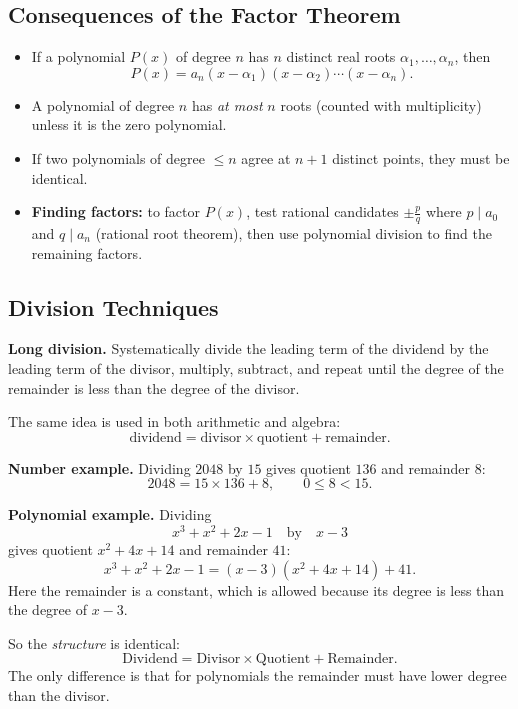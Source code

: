 \documentclass[12pt]{article}
\newenvironment{remark}[1][]{%
  \begin{remarkbox}[title={\bfseries Remark~\thetcbcounter\ifx\relax#1\relax\else\ (#1)\fi}]%
}{%
  \end{remarkbox}%
}
\begin{document}
\subsection{Consequences of the Factor Theorem}

\begin{itemize}[leftmargin=*]
  \item If a polynomial $P(x)$ of degree $n$ has $n$ distinct real roots $\alpha_1, \ldots, \alpha_n$, then
  \[
    P(x) = a_n(x - \alpha_1)(x - \alpha_2)\cdots(x - \alpha_n).
  \]
  \item A polynomial of degree $n$ has \emph{at most} $n$ roots (counted with multiplicity) unless it is the zero polynomial.
  \item If two polynomials of degree $\leq n$ agree at $n+1$ distinct points, they must be identical.
  \item \textbf{Finding factors:} to factor $P(x)$, test rational candidates $\pm\frac{p}{q}$ where $p \mid a_0$ and $q \mid a_n$ (rational root theorem), then use polynomial division to find the remaining factors.
\end{itemize}

\subsection{Division Techniques}

\textbf{Long division.} Systematically divide the leading term of the dividend by the leading term of the divisor, multiply, subtract, and repeat until the degree of the remainder is less than the degree of the divisor.

\begin{remark}[Comparing Number Division and Polynomial Division]
The same idea is used in both arithmetic and algebra:
\[
\text{dividend}=\text{divisor}\times\text{quotient}+\text{remainder}.
\]

\textbf{Number example.} Dividing $2048$ by $15$ gives quotient $136$ and remainder $8$:
\[
2048=15\times 136+8,
\qquad 0\le 8<15.
\]

\textbf{Polynomial example.} Dividing
\[
x^3+x^2+2x-1
\quad\text{by}\quad
x-3
\]
gives quotient $x^2+4x+14$ and remainder $41$:
\[
x^3+x^2+2x-1=(x-3)(x^2+4x+14)+41.
\]
Here the remainder is a constant, which is allowed because its degree is less than the degree of $x-3$.

So the \emph{structure} is identical:
\[
\boxed{\text{Dividend}=\text{Divisor}\times\text{Quotient}+\text{Remainder}.}
\]
The only difference is that for polynomials the remainder must have lower degree than the divisor.
\end{remark}
\end{document}
